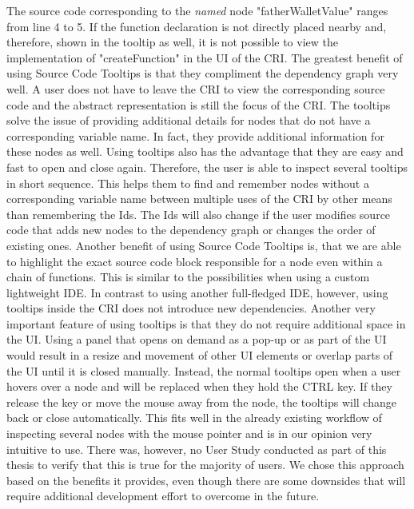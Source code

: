 The source code corresponding to the \emph{named} node "fatherWalletValue" ranges from line 4 to 5. If the function declaration is not directly placed nearby and, therefore, shown in the tooltip as well, it is not possible to view the implementation of "createFunction" in the UI of the CRI.
The greatest benefit of using Source Code Tooltips is that they compliment the dependency graph very well. A user does not have to leave the CRI to view the corresponding source code and the abstract representation is still the focus of the CRI. The tooltips solve the issue of providing additional details for nodes that do not have a corresponding variable name. In fact, they provide additional information for these nodes as well. Using tooltips also has the advantage that they are easy and fast to open and close again. Therefore, the user is able to inspect several tooltips in short sequence. This helps them to find and remember nodes without a corresponding variable name between multiple uses of the CRI by other means than remembering the Ids.  The Ids will also change if the user modifies source code that adds new nodes to the dependency graph or changes the order of existing ones. Another benefit of using Source Code Tooltips is, that we are able to highlight the exact source code block responsible for a node even within a chain of functions. This is similar to the possibilities when using a  custom lightweight IDE. In contrast to using another full-fledged IDE, however, using tooltips inside the CRI does not introduce new dependencies. Another very important feature of using tooltips is that they do not require additional space in the UI. Using a panel that opens on demand as a pop-up or as part of the UI would result in a resize and movement of other UI elements or overlap parts of the UI until it is closed manually. Instead, the normal tooltips open when a user hovers over a node and will be replaced when they hold the CTRL key. If they release the key or move the mouse away from the node, the tooltips will change back or close automatically. This fits well in the already existing workflow of inspecting several nodes with the mouse pointer and is in our opinion very intuitive to use. There was, however, no User Study conducted as part of this thesis to verify that this is true for the majority of users. We chose this approach based on the benefits it provides, even though there are some downsides that will require additional development effort to overcome in the future.
			

